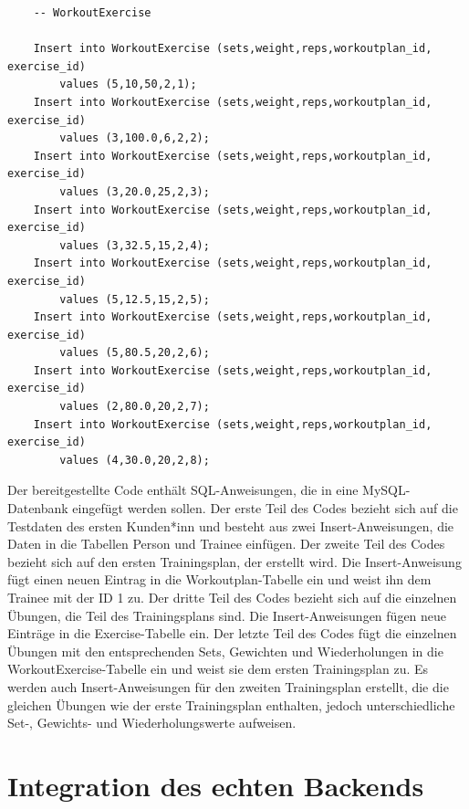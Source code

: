 \begin{verbatim}
    -- WorkoutExercise
    
    Insert into WorkoutExercise (sets,weight,reps,workoutplan_id, exercise_id) 
        values (5,10,50,2,1);
    Insert into WorkoutExercise (sets,weight,reps,workoutplan_id, exercise_id) 
        values (3,100.0,6,2,2);
    Insert into WorkoutExercise (sets,weight,reps,workoutplan_id, exercise_id) 
        values (3,20.0,25,2,3);
    Insert into WorkoutExercise (sets,weight,reps,workoutplan_id, exercise_id) 
        values (3,32.5,15,2,4);
    Insert into WorkoutExercise (sets,weight,reps,workoutplan_id, exercise_id) 
        values (5,12.5,15,2,5);
    Insert into WorkoutExercise (sets,weight,reps,workoutplan_id, exercise_id) 
        values (5,80.5,20,2,6);
    Insert into WorkoutExercise (sets,weight,reps,workoutplan_id, exercise_id) 
        values (2,80.0,20,2,7);
    Insert into WorkoutExercise (sets,weight,reps,workoutplan_id, exercise_id) 
        values (4,30.0,20,2,8);
\end{verbatim}
\newpage
Der bereitgestellte Code enthält SQL-Anweisungen, die in eine MySQL-Datenbank eingefügt werden sollen. Der erste Teil des Codes bezieht sich auf die Testdaten des ersten Kunden*inn und besteht aus zwei Insert-Anweisungen, die Daten in die Tabellen Person und Trainee einfügen.
\newline
\newline
Der zweite Teil des Codes bezieht sich auf den ersten Trainingsplan, der erstellt wird. Die Insert-Anweisung fügt einen neuen Eintrag in die Workoutplan-Tabelle ein und weist ihn dem Trainee mit der ID 1 zu.
\newline
\newline
Der dritte Teil des Codes bezieht sich auf die einzelnen Übungen, die Teil des Trainingsplans sind. Die Insert-Anweisungen fügen neue Einträge in die Exercise-Tabelle ein.
\newline
\newline
Der letzte Teil des Codes fügt die einzelnen Übungen mit den entsprechenden Sets, Gewichten und Wiederholungen in die WorkoutExercise-Tabelle ein und weist sie dem ersten Trainingsplan zu. Es werden auch Insert-Anweisungen für den zweiten Trainingsplan erstellt, die die gleichen Übungen wie der erste Trainingsplan enthalten, jedoch unterschiedliche Set-, Gewichts- und Wiederholungswerte aufweisen.
\newpage

\section{Integration des echten Backends}


